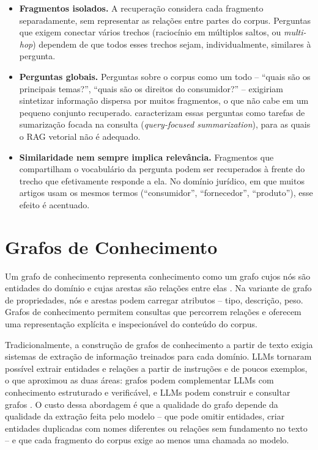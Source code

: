 \begin{itemize}
    \item \textbf{Fragmentos isolados.} A recuperação considera cada fragmento separadamente, sem representar as relações entre partes do corpus. Perguntas que exigem conectar vários trechos (raciocínio em múltiplos saltos, ou \textit{multi-hop}) dependem de que todos esses trechos sejam, individualmente, similares à pergunta.
    \item \textbf{Perguntas globais.} Perguntas sobre o corpus como um todo -- ``quais são os principais temas?'', ``quais são os direitos do consumidor?'' -- exigiriam sintetizar informação dispersa por muitos fragmentos, o que não cabe em um pequeno conjunto recuperado.  caracterizam essas perguntas como tarefas de sumarização focada na consulta (\textit{query-focused summarization}), para as quais o RAG vetorial não é adequado.
    \item \textbf{Similaridade nem sempre implica relevância.} Fragmentos que compartilham o vocabulário da pergunta podem ser recuperados à frente do trecho que efetivamente responde a ela. No domínio jurídico, em que muitos artigos usam os mesmos termos (``consumidor'', ``fornecedor'', ``produto''), esse efeito é acentuado.
\end{itemize}

\section{Grafos de Conhecimento}
\label{sec-referencial-kg}

Um grafo de conhecimento representa conhecimento como um grafo cujos nós são entidades do domínio e cujas arestas são relações entre elas \cite{hogan2021knowledge}. Na variante de grafo de propriedades, nós e arestas podem carregar atributos -- tipo, descrição, peso. Grafos de conhecimento permitem consultas que percorrem relações e oferecem uma representação explícita e inspecionável do conteúdo do corpus.

Tradicionalmente, a construção de grafos de conhecimento a partir de texto exigia sistemas de extração de informação treinados para cada domínio. LLMs tornaram possível extrair entidades e relações a partir de instruções e de poucos exemplos, o que aproximou as duas áreas: grafos podem complementar LLMs com conhecimento estruturado e verificável, e LLMs podem construir e consultar grafos \cite{pan2024unifying}. O custo dessa abordagem é que a qualidade do grafo depende da qualidade da extração feita pelo modelo -- que pode omitir entidades, criar entidades duplicadas com nomes diferentes ou relações sem fundamento no texto -- e que cada fragmento do corpus exige ao menos uma chamada ao modelo.

